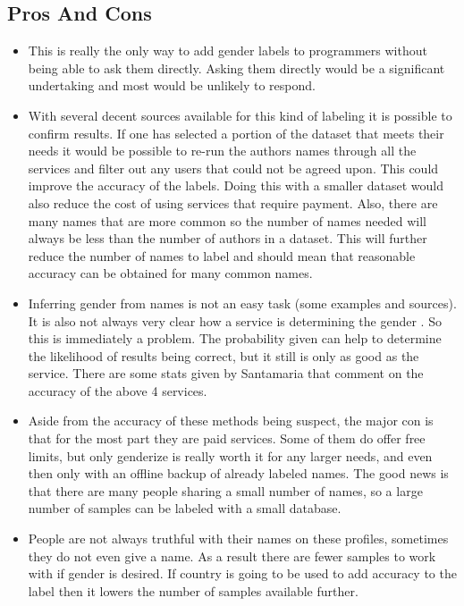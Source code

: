 \documentclass{article}
\begin{document}
\subsection{Pros And Cons}
\begin{itemize}
    \item This is really the only way to add gender labels to programmers without being able to ask them directly. Asking them directly would be a significant undertaking and most would be unlikely to respond.
    
    \item With several decent sources available for this kind of labeling it is possible to confirm results. If one has selected a portion of the dataset that meets their needs it would be possible to re-run the authors names through all the services and filter out any users that could not be agreed upon. This could improve the accuracy of the labels. Doing this with a smaller dataset would also reduce the cost of using services that require payment. Also, there are many names that are more common so the number of names needed will always be less than the number of authors in a dataset. This will further reduce the number of names to label and should mean that reasonable accuracy can be obtained for many common names.

    \item Inferring gender from names is not an easy task (some examples and sources). It is also not always very clear how a service is determining the gender \cite{Santamaria2018}. So this is immediately a problem. The probability given can help to determine the likelihood of results being correct, but it still is only as good as the service. There are some stats given by Santamaria \cite{Santamaria2018} that comment on the accuracy of the above 4 services.

    \item Aside from the accuracy of these methods being suspect, the major con is that for the most part they are paid services. Some of them do offer free limits, but only genderize is really worth it for any larger needs, and even then only with an offline backup of already labeled names. The good news is that there are many people sharing a small number of names, so a large number of samples can be labeled with a small database.

    \item People are not always truthful with their names on these profiles, sometimes they do not even give a name. As a result there are fewer samples to work with if gender is desired. If country is going to be used to add accuracy to the label then it lowers the number of samples available further.


\end{itemize}
\end{document}
